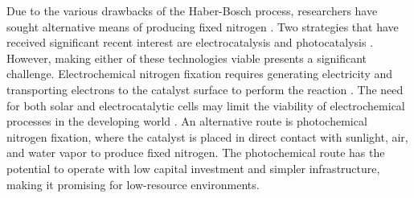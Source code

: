 Due to the various drawbacks of the Haber-Bosch process, researchers have sought alternative means of producing fixed nitrogen \cite{Comer_2019, McPherson_2019, WANG20181055, Kyriakou_2017, de_Bruijn_2015, Michalsky_2015}. 
Two strategies that have received significant recent interest are electrocatalysis \cite{McPherson_2019} and photocatalysis \cite{Medford_2017}. However, making either of these technologies viable presents a significant challenge. Electrochemical nitrogen fixation requires generating electricity and transporting electrons to the catalyst surface to perform the reaction \cite{Kyriakou_2017}. The need for both solar and electrocatalytic cells may limit the viability of electrochemical processes in the developing world \cite{Comer_2019}. An alternative route is photochemical nitrogen fixation, where the catalyst is placed in direct contact with sunlight, air, and water vapor  to produce fixed nitrogen. The photochemical route has the potential to operate with low capital investment and simpler infrastructure, making it promising for low-resource environments.

